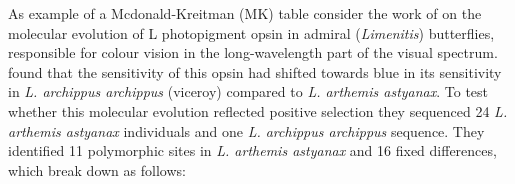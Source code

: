 As example of a Mcdonald-Kreitman (MK) table consider the work of \citet{frentiu2007adaptive} on the molecular evolution of L photopigment opsin in admiral
({\it Limenitis}) butterflies, responsible for colour vision in the
long-wavelength part of the visual
spectrum. \citeauthor{frentiu2007adaptive} found that the sensitivity
of this opsin had shifted towards blue in its sensitivity in {\it
  L. archippus archippus} (viceroy) compared to {\it  L. arthemis
  astyanax}. To test whether this molecular evolution reflected
positive selection they sequenced  24 {\it L. arthemis astyanax}
individuals and one {\it  L. archippus archippus} sequence. They
identified  11 polymorphic sites in  {\it L. arthemis astyanax} and 16
fixed differences, which break down as follows:
